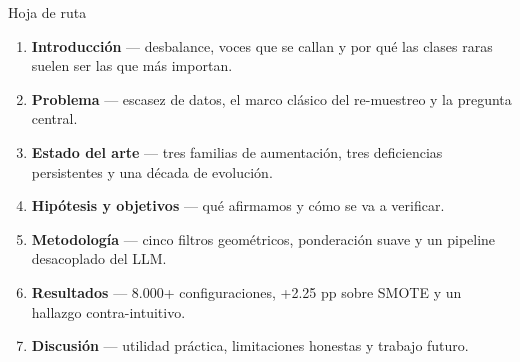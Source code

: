 \begin{frame}{Hoja de ruta}
\small
{}
\begin{enumerate}\setlength\itemsep{4pt}
  \item \textbf{Introducción} — desbalance, voces que se callan y por qué las clases raras suelen ser las que más importan.

  \item \textbf{Problema} — escasez de datos, el marco clásico del re-muestreo y la pregunta central.

  \item \textbf{Estado del arte} — tres familias de aumentación, tres deficiencias persistentes y una década de evolución.

  \item \textbf{Hipótesis y objetivos} — qué afirmamos y cómo se va a verificar.

  \item \textbf{Metodología} — cinco filtros geométricos, ponderación suave y un pipeline desacoplado del LLM.

  \item \textbf{Resultados} — \alert{8.000+ configuraciones}, +2.25 pp sobre SMOTE y un hallazgo contra-intuitivo.

  \item \textbf{Discusión} — utilidad práctica, limitaciones honestas y trabajo futuro.
\end{enumerate}
\end{frame}
